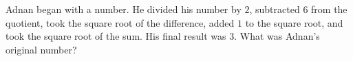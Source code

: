 Adnan began with a number. He divided his number by $2$, subtracted $6$ from the quotient, took the square root of the difference, added $1$ to the square root, and took the square root of the sum. His final result was $3$. What was Adnan's original number?
